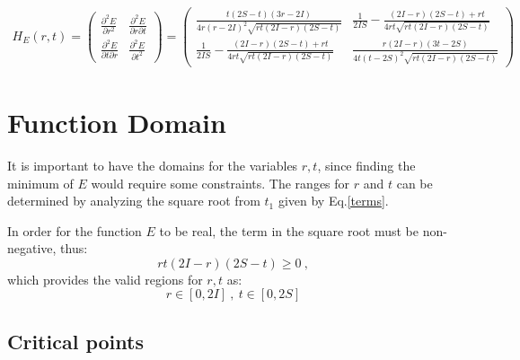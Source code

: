 \documentclass[a4paper]{article}
\begin{document}
\begin{align}
H_{E}(r,t) = 
\begin{pmatrix}
\frac{\partial^2 E}{\partial r^2} & \frac{\partial^2 E}{\partial r \partial t} \\
\frac{\partial^2 E}{\partial t \partial r} & \frac{\partial^2 E}{\partial t^2}
\end{pmatrix}
= 
\begin{pmatrix}
\frac{t(2S-t)(3r-2I)}{4r(r-2I)^2\sqrt{rt(2I-r)(2S-t)}} & \frac{1}{2IS} - \frac{(2I-r)(2S-t) + rt}{4rt\sqrt{rt(2I-r)(2S-t)}} \\
\frac{1}{2IS} - \frac{(2I-r)(2S-t) + rt}{4rt\sqrt{rt(2I-r)(2S-t)}} & \frac{r(2I-r)(3t-2S)}{4t(t-2S)^2\sqrt{rt(2I-r)(2S-t)}}
\end{pmatrix}
\end{align}

\section{Function Domain}

It is important to have the domains for the variables $r, t$, since finding the minimum of $E$ would require some constraints. The ranges for $r$ and $t$ can be determined by analyzing the square root from $t_1$ given by Eq.\eqref{terms}.

In order for the function $E$ to be real, the term in the square root must be non-negative, thus:
$$rt(2I-r)(2S-t)\geq 0\ ,$$
which provides the valid regions for $r, t$ as:
$$r\in [0, 2I]\ , \ t\in [0, 2S]$$

\subsection{Critical points}
\end{document}
